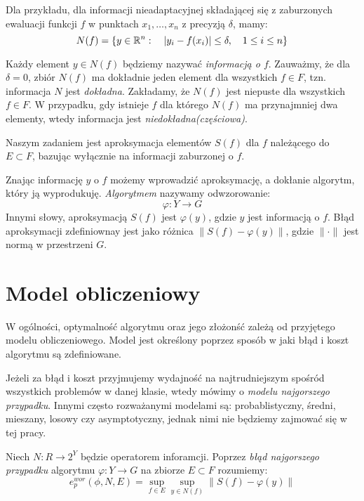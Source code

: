 \documentclass[oik, pdftex, robocza, man]{mgrwms}
\begin{document}
    Dla przykładu, dla informacji nieadaptacyjnej składającej się z zaburzonych ewaluacji funkcji $f$ w punktach $x_{1}, \dots, x_{n}$ z precyzją $\delta$, mamy:
    \begin{equation*}
        N(f) = \{y \in \mathbb{R}^{n} : \quad |y_{i} - f(x_{i})| \leq \delta, \quad 1 \leq i \leq n\}
    \end{equation*}
    
    Każdy element $y \in N(f)$ będziemy nazywać \textit{informacją o $f$}. Zauważmy, że dla $\delta = 0$, zbiór $N(f)$ ma dokładnie jeden element dla wszystkich $f \in F$, tzn. informacja $N$ jest \textit{dokładna}. Zakładamy, że $N(f)$ jest niepuste dla wszystkich $f \in F$. W przypadku, gdy istnieje $f$ dla którego $N(f)$ ma przynajmniej dwa elementy, wtedy informacja jest \textit{niedokładna(częściowa)}.

    Naszym zadaniem jest aproksymacja elementów $S(f)$ dla $f$ należącego do $E \subset F$, bazując wyłącznie na informacji zaburzonej o $f$. 

    Znając informację $y$ o $f$ możemy wprowadzić aproksymację, a dokłanie algorytm, który ją wyprodukuję. \textit{Algorytmem} nazywamy odwzorowanie:
    \begin{equation*}
        \varphi : Y \rightarrow G
    \end{equation*}
    Innymi słowy, aproksymacją $S(f)$ jest $\varphi(y)$, gdzie $y$ jest informacją o $f$. Błąd aproksymacji zdefiniownay jest jako różnica $\| S(f) - \varphi(y) \|$, gdzie $\|\cdot\|$ jest normą w przestrzeni $G$.


\section{Model obliczeniowy}

    W ogólności, optymalność algorytmu oraz jego złożonść zależą od przyjętego modelu obliczeniowego. Model jest określony poprzez sposób w jaki błąd i koszt algorytmu są zdefiniowane. 
    
    
    Jeżeli za błąd i koszt przyjmujemy wydajność na najtrudniejszym spośród wszystkich problemów w danej klasie, wtedy mówimy o \textit{modelu najgorszego przypadku}. Innymi często rozważanymi modelami są: probablistyczny, średni, mieszany, losowy czy asymptotyczny, jednak nimi nie będziemy zajmować się w tej pracy.

    Niech $N : R \rightarrow 2^{Y}$ będzie operatorem inforamcji. Poprzez \textit{błąd najgorszego przypadku} algorytmu $\varphi : Y \rightarrow G$ na zbiorze $E \subset F$ rozumiemy:
    \begin{equation*}
        e^{wor}_{p}(\phi, N, E) = \sup_{f \in E} \sup_{y \in N(f)} \|S(f) - \varphi(y) \|
    \end{equation*}
\end{document}
